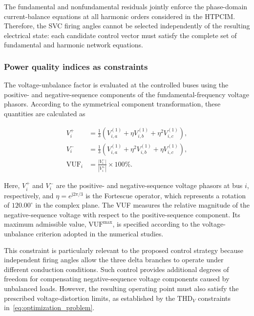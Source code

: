 \documentclass[journal]{IEEEtran}
\begin{document}
The fundamental and nonfundamental residuals jointly enforce the
phase-domain current-balance equations at all harmonic orders
considered in the HTPCIM. Therefore, the SVC firing angles cannot
be selected independently of the resulting electrical state:
each candidate control vector must satisfy the complete set of
fundamental and harmonic network equations.

\subsubsection{Power quality indices as constraints}

The voltage-unbalance factor is evaluated at the controlled buses
using the positive- and negative-sequence components of the
fundamental-frequency voltage phasors. According to the symmetrical
component transformation, these quantities are calculated as

\begin{subequations}
\label{eq:vuf}
\begin{align}
    V_i^{+}&=\frac{1}{3}
    \left(V_{i,a}^{(1)}+\eta V_{i,b}^{(1)}+\eta^2V_{i,c}^{(1)}\right),\\
    V_i^{-}&=\frac{1}{3}
    \left(V_{i,a}^{(1)}+\eta^2V_{i,b}^{(1)}+\eta V_{i,c}^{(1)}\right),\\
    \mathrm{VUF}_i&=
    \frac{|V_i^{-}|}{|V_i^{+}|}\times100\%.
\end{align}
\end{subequations}

Here, $V_i^{+}$ and $V_i^{-}$ are the positive- and negative-sequence
voltage phasors at bus $i$, respectively, and
$\eta=e^{\mathrm{j}2\pi/3}$ is the Fortescue operator, which represents
a rotation of $120.00^\circ$ in the complex plane. The VUF measures the
relative magnitude of the negative-sequence voltage with respect
to the positive-sequence component. Its maximum admissible value,
$\mathrm{VUF}^{\max}$, is specified according to the voltage-unbalance
criterion adopted in the numerical studies.

This constraint is particularly relevant to the proposed control
strategy because independent firing angles allow the three delta
branches to operate under different conduction conditions. Such
control provides additional degrees of freedom for compensating
negative-sequence voltage components caused by unbalanced loads.
However, the resulting operating point must also satisfy the
prescribed voltage-distortion limits, as established by the
$\mathrm{THD}_V$ constraints in~\eqref{eq:optimization_problem}.
\end{document}
